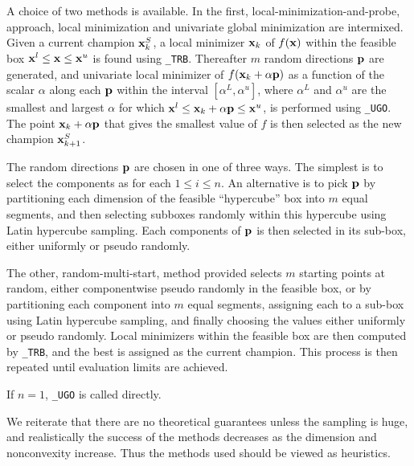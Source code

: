 \documentclass{galahad}
\begin{document}
\galmethod
A choice of two methods is available. 
In the first, local-minimization-and-probe, approach, local minimization
and univariate global minimization are intermixed. Given a current 
champion ${\mathbf{x}}^S_k$, a local minimizer ${\mathbf{x}}_k$ of $f({\mathbf{x}})$ within the
feasible box ${\mathbf{x}}^l \leq {\mathbf{x}} \leq {\mathbf{x}}^u$ is found using 
{\tt \libraryname\_TRB}.
Thereafter $m$ random directions ${\mathbf{p}}$ are generated, and univariate
local minimizer of $f({\mathbf{x}}_k + \alpha {\mathbf{p}})$ as a function of the scalar
$\alpha$ along each ${\mathbf{p}}$ within the interval $[\alpha^L,\alpha^u]$,
where $\alpha^L$ and $\alpha^u$ are the smallest and largest $\alpha$ 
for which ${\mathbf{x}}^l \leq {\mathbf{x}}_k + \alpha {\mathbf{p}} \leq {\mathbf{x}}^u$, 
is performed using {\tt \libraryname\_UGO}. The point ${\mathbf{x}}_k + \alpha {\mathbf{p}}$
that gives the smallest value of $f$ is then selected as the new champion
${\mathbf{x}}^S_{k+1}$.

The random directions ${\mathbf{p}}$ are chosen in one of three ways. The simplest is
to select the components as
for each $1 \leq i \leq n$. An alternative is to 
pick ${\mathbf{p}}$ by partitioning each dimension of the feasible ``hypercube'' box 
into $m$ equal segments, and then selecting subboxes
randomly within this hypercube using Latin hypercube sampling.
Each components of ${\mathbf{p}}$ is then selected in its sub-box, either uniformly
or pseudo randomly.

The other, random-multi-start, method provided selects $m$ starting points 
at random, either componentwise pseudo randomly in the feasible box, 
or by partitioning each component into $m$ equal segments, assigning each to
a sub-box using Latin hypercube sampling, and finally choosing the
values either uniformly or pseudo randomly. Local minimizers within the
feasible box are then computed by {\tt \libraryname\_TRB}, and
the best is assigned as the current champion. This process is then
repeated until evaluation limits are achieved.

If $n=1$, {\tt \libraryname\_UGO} is called directly.

We reiterate that there are no theoretical guarantees unless the sampling 
is huge, and realistically the success of the methods decreases as the 
dimension and nonconvexity increase. Thus the methods used should be viewed
as heuristics.
\end{document}
